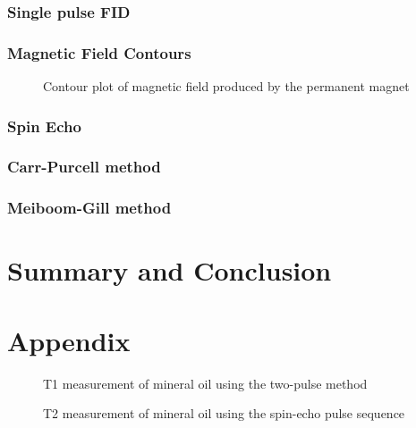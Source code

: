 \documentclass[
reprint,
amsmath,amssymb,
aps,
tikz,
border=5pt
]{revtex4-1}
\begin{document}
  
\subsubsection*{Single pulse FID}

\subsubsection*{Magnetic Field Contours}

  \begin{figure}[h]
    \resizebox{0.55\textwidth}{!}{}
    \caption{Contour plot of magnetic field produced by the permanent magnet}
    \label{fig:mo_t1}
  \end{figure}
\subsubsection*{Spin Echo}

\subsubsection*{Carr-Purcell method}

\subsubsection*{Meiboom-Gill method}

\section*{Summary \lowercase{and} Conclusion}



\section*{Appendix}


  
  \begin{figure}[h]
    \resizebox{0.45\textwidth}{!}{}
    \caption{T1 measurement of mineral oil using the two-pulse method }
    \label{fig:mo_t1}
  \end{figure}

  \begin{figure}[h]
    \resizebox{0.45\textwidth}{!}{}
    \caption{T2 measurement of mineral oil using the spin-echo pulse sequence }
    \label{fig:mo_se}
  \end{figure}
\end{document}
